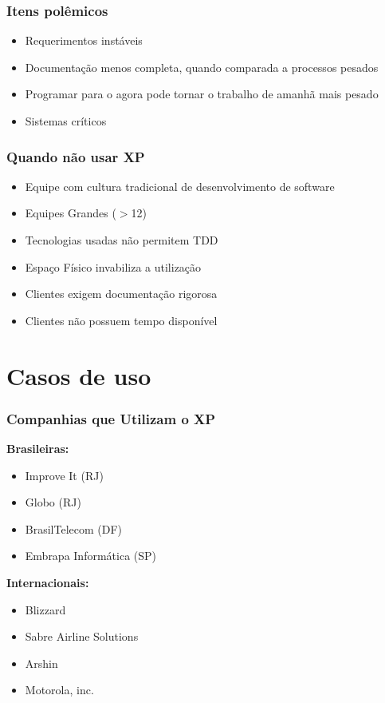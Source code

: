 \documentclass[10pt]{beamer}
\begin{document}
\begin{frame}
  \frametitle{Itens polêmicos}
  \begin{itemize}
  \item Requerimentos instáveis
  \item Documentação menos completa, quando comparada a processos pesados
  \item Programar para o agora pode tornar o trabalho de amanhã mais pesado
  \item Sistemas críticos
  \end{itemize}
\end{frame}


\begin{frame}
  \frametitle{Quando não usar XP}
  \begin{itemize}
  \item Equipe com cultura tradicional de desenvolvimento de software
  \item Equipes Grandes ($>$12)
  \item Tecnologias usadas não permitem TDD
  \item Espaço Físico invabiliza a utilização
  \item Clientes exigem documentação rigorosa
  \item Clientes não possuem tempo disponível
  \end{itemize}
\end{frame}

\section{Casos de uso}
\begin{frame}
  \frametitle{Companhias que Utilizam o XP}
  \textbf{Brasileiras:}
  \begin{itemize}
    \item Improve It (RJ)
    \item Globo (RJ)
    \item BrasilTelecom (DF)
    \item Embrapa Informática (SP)
  \end{itemize}
  \textbf{Internacionais:}
  \begin{itemize}
    \item Blizzard
    \item Sabre Airline Solutions
    \item Arshin
    \item Motorola, inc.
  \end{itemize}
\end{frame}
\end{document}
